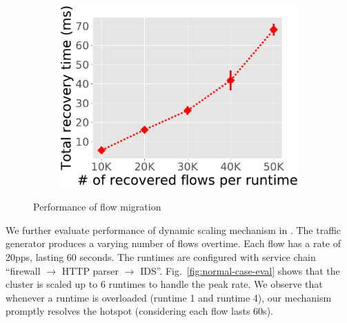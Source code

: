 \begin{figure}[!t]
\begin{center}
\begin{minipage}[t]{0.615\linewidth}
\begin{subfigure}[t]{0.48\linewidth}
		\caption{}\label{fig:rep-scale}
	 \end{subfigure}\hfill
	 \begin{subfigure}[t]{0.49\linewidth}
	\centering
		\includegraphics[width=1\columnwidth]{figure/Recover.pdf}
		\caption{}\label{fig:rep-recovery} \end{subfigure}
	\caption{Performance of flow migration}
\label{fig:rep-perf}
\end{minipage}
\end{center}
\vspace{-5mm}
\end{figure}


We further evaluate performance of dynamic scaling mechanism in \nfactor. The traffic generator produces a varying number of flows overtime. Each flow has a rate of 20pps, lasting 60 seconds. The runtimes are configured with service chain ``firewall $\rightarrow$ HTTP parser $\rightarrow$ IDS''. Fig.~\ref{fig:normal-case-eval} shows that the cluster is scaled up to 6 runtimes to handle the peak rate. We observe that whenever a runtime is overloaded (runtime 1 and runtime 4), our mechanism promptly resolves the hotspot (considering each flow lasts 60s). %

